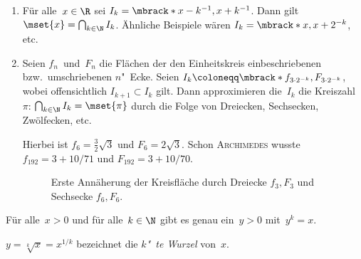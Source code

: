 \documentclass[a4paper]{article}
\begin{document}
\begin{example}\leavevmode
    \begin{enumerate}
        \item Für alle~$x \in \R$ sei $I_k = \mbrack*{x-k^{-1}, x+k^{-1}}$. Dann gilt $\mset{x} = \bigcap_{k\in\N} I_k$. Ähnliche Beispiele wären $I_k = \mbrack*{x, x+2^{-k}}$, etc.
        \item Seien $f_n$~und~$F_n$ die Flächen der den Einheitskreis einbeschriebenen bzw.\ umschriebenen $n$"~Ecke. Seien $I_k \coloneqq \mbrack*{f_{3\cdot2^{-k}}, F_{3\cdot2^{-k}}}$, wobei offensichtlich $I_{k+1} \subset I_k$ gilt. Dann approximieren die~$I_k$ die Kreiszahl~$\pi$: $\bigcap_{k\in\N} I_k = \mset{\pi}$ durch die Folge von Dreiecken, Sechsecken, Zwölfecken, etc.

              Hierbei ist $f_6 = \frac{3}{2} \sqrt{3}$ und $F_6 = 2 \sqrt{3}$. Schon \textsc{Archimedes} wusste $f_{192} = 3 + 10/71$ und $F_{192} = 3 + 10/70$.

              \begin{figure}
                  \caption{Erste Annäherung der Kreisfläche durch Dreiecke $f_3, F_3$ und Sechsecke $f_6, F_6$.}
              \end{figure}
    \end{enumerate}
\end{example}

\begin{theorem}
    Für alle~$x > 0$ und für alle~$k \in \N$ gibt es genau ein~$y > 0$ mit~$y^k = x$.
\end{theorem}

\begin{notation}
    $y = \sqrt[k]{x} = x^{1/k}$ bezeichnet die \emph{$k$"~te Wurzel} von~$x$.
\end{notation}
\end{document}
